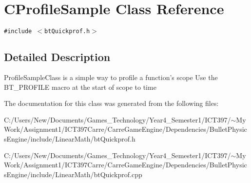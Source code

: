 \hypertarget{class_c_profile_sample}{
\section{CProfileSample Class Reference}
\label{class_c_profile_sample}
}
{\tt \#include $<$btQuickprof.h$>$}



\subsection{Detailed Description}
ProfileSampleClass is a simple way to profile a function's scope Use the BT\_\-PROFILE macro at the start of scope to time 

The documentation for this class was generated from the following files:\begin{CompactItemize}
\item 
C:/Users/New/Documents/Games\_\-Technology/Year4\_\-Semester1/ICT397/$\sim$My Work/Assignment1/ICT397Carre/CarreGameEngine/Dependencies/BulletPhysicsEngine/include/LinearMath/btQuickprof.h\item 
C:/Users/New/Documents/Games\_\-Technology/Year4\_\-Semester1/ICT397/$\sim$My Work/Assignment1/ICT397Carre/CarreGameEngine/Dependencies/BulletPhysicsEngine/include/LinearMath/btQuickprof.cpp\end{CompactItemize}
